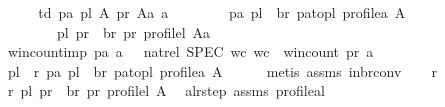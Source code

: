 \begin{isabellebody}
\isamarkupfalse%
\ {\isacharminus}{\kern0pt}\isanewline
\ \ \isamarkupfalse%
\ td{\isacharcolon}{\kern0pt}\ {\isachardoublequoteopen}{\isasymAnd}pa\ pl\ A\ pr\ Aa\ a{\isachardot}{\kern0pt}\isanewline
\ \ \ \ \ \ \ \ {\isacharparenleft}{\kern0pt}pa{\isacharcomma}{\kern0pt}\ pl{\isacharparenright}{\kern0pt}\ {\isasymin}\ br\ pa{\isacharunderscore}{\kern0pt}to{\isacharunderscore}{\kern0pt}pl\ {\isacharparenleft}{\kern0pt}profile{\isacharunderscore}{\kern0pt}a\ A{\isacharparenright}{\kern0pt}\ {\isasymLongrightarrow}\isanewline
\ \ \ \ \ \ \ \ {\isacharparenleft}{\kern0pt}pl{\isacharcomma}{\kern0pt}\ pr{\isacharparenright}{\kern0pt}\ {\isasymin}\ br\ pr{}{\isacharunderscore}{\kern0pt}{\isasymalpha}\ {\isacharparenleft}{\kern0pt}profile{\isacharunderscore}{\kern0pt}l\ Aa{\isacharparenright}{\kern0pt}\ {\isasymLongrightarrow}\ \isanewline
\ win{\isacharunderscore}{\kern0pt}count{\isacharunderscore}{\kern0pt}imp{}\ pa\ a\ {\isasymle}\ {\isasymDown}\ nat{\isacharunderscore}{\kern0pt}rel\ {\isacharparenleft}{\kern0pt}SPEC\ {\isacharparenleft}{\kern0pt}{\isasymlambda}wc{\isachardot}{\kern0pt}\ wc\ {\isacharequal}{\kern0pt}\ win{\isacharunderscore}{\kern0pt}count\ pr\ a{\isacharparenright}{\kern0pt}{\isacharparenright}{\kern0pt}{\isachardoublequoteclose}\isanewline
\ \ \isamarkupfalse%
\ pl\ \ r{}{\isacharcolon}{\kern0pt}\ {\isachardoublequoteopen}{\isacharparenleft}{\kern0pt}pa{\isacharcomma}{\kern0pt}\ pl{\isacharparenright}{\kern0pt}\ {\isasymin}\ br\ pa{\isacharunderscore}{\kern0pt}to{\isacharunderscore}{\kern0pt}pl\ {\isacharparenleft}{\kern0pt}profile{\isacharunderscore}{\kern0pt}a\ A{\isacharparenright}{\kern0pt}{\isachardoublequoteclose}\isanewline
\ \ \ \ \isamarkupfalse%
\ {\isacharparenleft}{\kern0pt}metis\ assms\ in{\isacharunderscore}{\kern0pt}br{\isacharunderscore}{\kern0pt}conv{\isacharparenright}{\kern0pt}\isanewline
\ \ \isamarkupfalse%
\ r{}\ \isamarkupfalse%
\ r{}{\isacharcolon}{\kern0pt}\ {\isachardoublequoteopen}{\isacharparenleft}{\kern0pt}pl{\isacharcomma}{\kern0pt}\ pr{\isacharparenright}{\kern0pt}\ {\isasymin}\ br\ pr{}{\isacharunderscore}{\kern0pt}{\isasymalpha}\ {\isacharparenleft}{\kern0pt}profile{\isacharunderscore}{\kern0pt}l\ A{\isacharparenright}{\kern0pt}{\isachardoublequoteclose}\ \isamarkupfalse%
\ a{\isacharunderscore}{\kern0pt}l{\isacharunderscore}{\kern0pt}r{\isacharunderscore}{\kern0pt}step\ assms\ profile{\isacharunderscore}{\kern0pt}a{\isacharunderscore}{\kern0pt}l\isanewline

\end{isabellebody}
